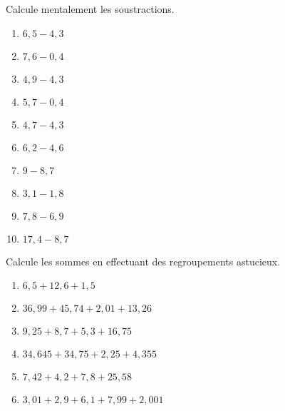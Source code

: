 \begin{exercice}
Calcule mentalement les soustractions.
\begin{enumerate} 
 \item $6,5 - 4,3$ \dotfill \hspace*{12em}
 
 \item $7,6 - 0,4$ \dotfill \hspace*{12em}
 
 \item $4,9 - 4,3$ \dotfill \hspace*{12em}
 
 \item $5,7 - 0,4$ \dotfill \hspace*{12em}
 
 \item $4,7 - 4,3$ \dotfill \hspace*{12em}
 
 \item $6,2 - 4,6$ \dotfill \hspace*{12em}
 
 \item $9 - 8,7$ \dotfill \hspace*{12em}
 
 \item $3,1 - 1,8$ \dotfill \hspace*{12em}
 
 \item $7,8 - 6,9$ \dotfill \hspace*{12em}
 
 \item \hspace{0.2em}$17,4 - 8,7$ \dotfill \hspace*{12em}
 
 \end{enumerate}  
\end{exercice}


\begin{exercice}
Calcule les sommes en effectuant des regroupements astucieux.
\begin{enumerate} 
 \item $6,5 + 12,6 + 1,5$
 \item $36,99 + 45,74 + 2,01 + 13,26$
 \item $9,25 + 8,7 + 5,3 + 16,75$
 \item $34,645 + 34,75 + 2,25 + 4,355$
 \item $7,42 + 4,2 + 7,8 + 25,58$
 \item $3,01 + 2,9 + 6,1 + 7,99 + 2,001$
 \end{enumerate}
\end{exercice}


